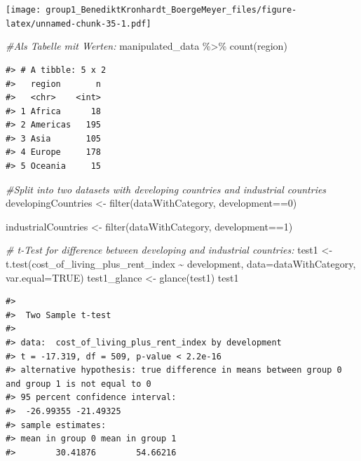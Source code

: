 \documentclass[
  11pt,
  a4paper,
  twoside]{scrbook}
\newenvironment{Shaded}{\begin{snugshade}}{\end{snugshade}}
\newcommand{\AttributeTok}[1]{\textcolor[rgb]{0.77,0.63,0.00}{#1}}
\newcommand{\CommentTok}[1]{\textcolor[rgb]{0.56,0.35,0.01}{\textit{#1}}}
\newcommand{\ConstantTok}[1]{\textcolor[rgb]{0.00,0.00,0.00}{#1}}
\newcommand{\DecValTok}[1]{\textcolor[rgb]{0.00,0.00,0.81}{#1}}
\newcommand{\FunctionTok}[1]{\textcolor[rgb]{0.00,0.00,0.00}{#1}}
\newcommand{\NormalTok}[1]{#1}
\newcommand{\OtherTok}[1]{\textcolor[rgb]{0.56,0.35,0.01}{#1}}
\newcommand{\SpecialCharTok}[1]{\textcolor[rgb]{0.00,0.00,0.00}{#1}}
\begin{document}
\linespread{1}\texttt{[image: group1\_BenediktKronhardt\_BoergeMeyer\_files/figure-latex/unnamed-chunk-35-1.pdf]} \linespread{1}

\begin{Shaded}
\begin{Highlighting}[]

\CommentTok{\#Als Tabelle mit Werten:}
\NormalTok{manipulated\_data }\SpecialCharTok{\%\textgreater{}\%} \FunctionTok{count}\NormalTok{(region)}
\end{Highlighting}
\end{Shaded}

\linespread{1}

\begin{verbatim}
#> # A tibble: 5 x 2
#>   region       n
#>   <chr>    <int>
#> 1 Africa      18
#> 2 Americas   195
#> 3 Asia       105
#> 4 Europe     178
#> 5 Oceania     15
\end{verbatim}

\linespread{1}

\begin{Shaded}
\begin{Highlighting}[]


\CommentTok{\#Split into two datasets with developing countries and industrial countries}
\NormalTok{developingCountries }\OtherTok{\textless{}{-}} \FunctionTok{filter}\NormalTok{(dataWithCategory, development}\SpecialCharTok{==}\DecValTok{0}\NormalTok{)}

\NormalTok{industrialCountries }\OtherTok{\textless{}{-}} \FunctionTok{filter}\NormalTok{(dataWithCategory, development}\SpecialCharTok{==}\DecValTok{1}\NormalTok{)}


\CommentTok{\# t{-}Test for difference between developing and industrial countries:}
\NormalTok{test1 }\OtherTok{\textless{}{-}} \FunctionTok{t.test}\NormalTok{(cost\_of\_living\_plus\_rent\_index }\SpecialCharTok{\textasciitilde{}}\NormalTok{ development, }\AttributeTok{data=}\NormalTok{dataWithCategory, }\AttributeTok{var.equal=}\ConstantTok{TRUE}\NormalTok{)}
\NormalTok{test1\_glance }\OtherTok{\textless{}{-}} \FunctionTok{glance}\NormalTok{(test1)}
\NormalTok{test1}
\end{Highlighting}
\end{Shaded}

\linespread{1}

\begin{verbatim}
#> 
#>  Two Sample t-test
#> 
#> data:  cost_of_living_plus_rent_index by development
#> t = -17.319, df = 509, p-value < 2.2e-16
#> alternative hypothesis: true difference in means between group 0 and group 1 is not equal to 0
#> 95 percent confidence interval:
#>  -26.99355 -21.49325
#> sample estimates:
#> mean in group 0 mean in group 1 
#>        30.41876        54.66216
\end{verbatim}
\end{document}
